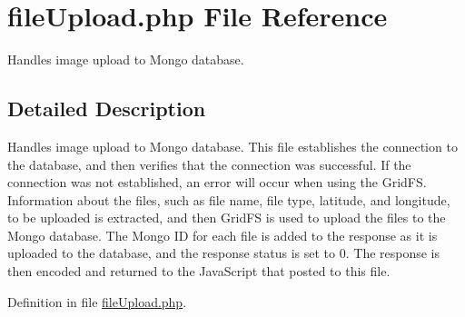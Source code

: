 \hypertarget{file_upload_8php}{\section{file\-Upload.\-php \-File \-Reference}
\label{file_upload_8php}
}


\-Handles image upload to \-Mongo database.  




\subsection{\-Detailed \-Description}
\-Handles image upload to \-Mongo database. \-This file establishes the connection to the database, and then verifies that the connection was successful. \-If the connection was not established, an error will occur when using the \-Grid\-F\-S. \-Information about the files, such as file name, file type, latitude, and longitude, to be uploaded is extracted, and then \-Grid\-F\-S is used to upload the files to the \-Mongo database. \-The \-Mongo \-I\-D for each file is added to the response as it is uploaded to the database, and the response status is set to 0. \-The response is then encoded and returned to the \-Java\-Script that posted to this file. 

\-Definition in file \hyperlink{file_upload_8php_source}{file\-Upload.\-php}.

